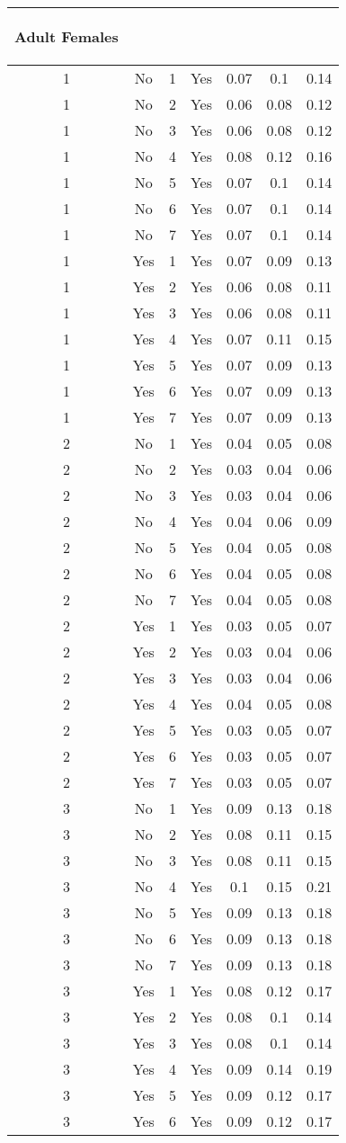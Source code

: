 \begin{table}
\begin{tabular}{|c|c|c|c|c|c|c|}
\begin{cellvarwidth}[t]
Adult Females
\end{cellvarwidth}\tabularnewline
\hline 
\hline 
1 & No & 1 & Yes & 0.07 & 0.1 & 0.14\tabularnewline
\hline 
1 & No & 2 & Yes & 0.06 & 0.08 & 0.12\tabularnewline
\hline 
1 & No & 3 & Yes & 0.06 & 0.08 & 0.12\tabularnewline
\hline 
1 & No & 4 & Yes & 0.08 & 0.12 & 0.16\tabularnewline
\hline 
1 & No & 5 & Yes & 0.07 & 0.1 & 0.14\tabularnewline
\hline 
1 & No & 6 & Yes & 0.07 & 0.1 & 0.14\tabularnewline
\hline 
1 & No & 7 & Yes & 0.07 & 0.1 & 0.14\tabularnewline
\hline 
1 & Yes & 1 & Yes & 0.07 & 0.09 & 0.13\tabularnewline
\hline 
1 & Yes & 2 & Yes & 0.06 & 0.08 & 0.11\tabularnewline
\hline 
1 & Yes & 3 & Yes & 0.06 & 0.08 & 0.11\tabularnewline
\hline 
1 & Yes & 4 & Yes & 0.07 & 0.11 & 0.15\tabularnewline
\hline 
1 & Yes & 5 & Yes & 0.07 & 0.09 & 0.13\tabularnewline
\hline 
1 & Yes & 6 & Yes & 0.07 & 0.09 & 0.13\tabularnewline
\hline 
1 & Yes & 7 & Yes & 0.07 & 0.09 & 0.13\tabularnewline
\hline 
2 & No & 1 & Yes & 0.04 & 0.05 & 0.08\tabularnewline
\hline 
2 & No & 2 & Yes & 0.03 & 0.04 & 0.06\tabularnewline
\hline 
2 & No & 3 & Yes & 0.03 & 0.04 & 0.06\tabularnewline
\hline 
2 & No & 4 & Yes & 0.04 & 0.06 & 0.09\tabularnewline
\hline 
2 & No & 5 & Yes & 0.04 & 0.05 & 0.08\tabularnewline
\hline 
2 & No & 6 & Yes & 0.04 & 0.05 & 0.08\tabularnewline
\hline 
2 & No & 7 & Yes & 0.04 & 0.05 & 0.08\tabularnewline
\hline 
2 & Yes & 1 & Yes & 0.03 & 0.05 & 0.07\tabularnewline
\hline 
2 & Yes & 2 & Yes & 0.03 & 0.04 & 0.06\tabularnewline
\hline 
2 & Yes & 3 & Yes & 0.03 & 0.04 & 0.06\tabularnewline
\hline 
2 & Yes & 4 & Yes & 0.04 & 0.05 & 0.08\tabularnewline
\hline 
2 & Yes & 5 & Yes & 0.03 & 0.05 & 0.07\tabularnewline
\hline 
2 & Yes & 6 & Yes & 0.03 & 0.05 & 0.07\tabularnewline
\hline 
2 & Yes & 7 & Yes & 0.03 & 0.05 & 0.07\tabularnewline
\hline 
3 & No & 1 & Yes & 0.09 & 0.13 & 0.18\tabularnewline
\hline 
3 & No & 2 & Yes & 0.08 & 0.11 & 0.15\tabularnewline
\hline 
3 & No & 3 & Yes & 0.08 & 0.11 & 0.15\tabularnewline
\hline 
3 & No & 4 & Yes & 0.1 & 0.15 & 0.21\tabularnewline
\hline 
3 & No & 5 & Yes & 0.09 & 0.13 & 0.18\tabularnewline
\hline 
3 & No & 6 & Yes & 0.09 & 0.13 & 0.18\tabularnewline
\hline 
3 & No & 7 & Yes & 0.09 & 0.13 & 0.18\tabularnewline
\hline 
3 & Yes & 1 & Yes & 0.08 & 0.12 & 0.17\tabularnewline
\hline 
3 & Yes & 2 & Yes & 0.08 & 0.1 & 0.14\tabularnewline
\hline 
3 & Yes & 3 & Yes & 0.08 & 0.1 & 0.14\tabularnewline
\hline 
3 & Yes & 4 & Yes & 0.09 & 0.14 & 0.19\tabularnewline
\hline 
3 & Yes & 5 & Yes & 0.09 & 0.12 & 0.17\tabularnewline
\hline 
3 & Yes & 6 & Yes & 0.09 & 0.12 & 0.17\tabularnewline

\end{tabular}
\end{table}
